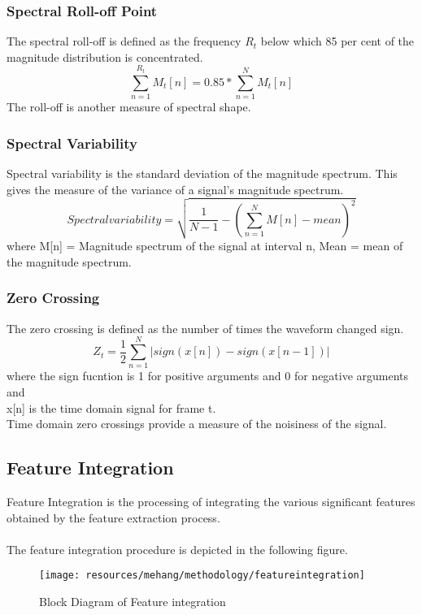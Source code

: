 \subsubsection{Spectral Roll-off Point}
The spectral roll-off is defined as the frequency $R_t$ below which 85 per cent of the magnitude distribution is concentrated.
\begin{equation}
        \sum_{n=1}^{R_t}M_t[n] = 0.85*\sum_{n=1}^{N}{M_t[n]}
\end{equation}
The roll-off is another measure of spectral shape.

\subsubsection{Spectral Variability}
  Spectral variability is the standard deviation of the magnitude spectrum. This gives the 
  measure of the variance of a signal's magnitude spectrum. 
  \begin{equation}
          Spectral variability = \sqrt{\frac{1}{N-1}-(\sum_{n=1}^{N}{M[n]-mean})^2}
  \end{equation}
  where M[n] = Magnitude spectrum of the signal at interval n,
  Mean = mean of the magnitude spectrum.

\subsubsection{Zero Crossing}
The zero crossing is defined as the number of times the waveform changed sign.
\begin{equation}
        Z_t = \frac{1}{2}\sum_{n=1}^{N}{|sign(x[n])-sign(x[n-1])|}
\end{equation}
where the sign fucntion is 1 for positive arguments and 0 for negative arguments and\\
x[n] is the time domain signal for frame t.\\
Time domain zero crossings provide a measure of the noisiness of the signal.
\newpage
\subsection{Feature Integration}
Feature Integration is the processing of integrating the various significant features obtained by the feature extraction process.\\
\\
The feature integration procedure is depicted in the following figure.
\begin{figure}[h!]
        \centering
        \texttt{[image: resources/mehang/methodology/featureintegration]}
        \caption{Block Diagram of Feature integration}
\end{figure}


